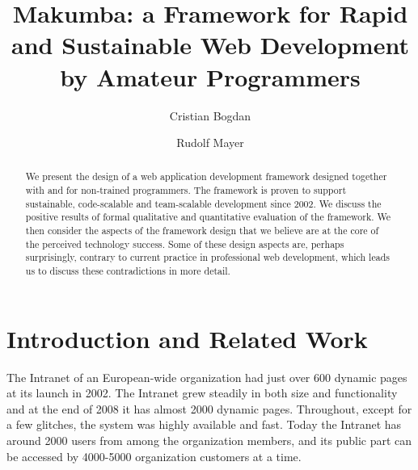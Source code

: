 \documentclass{llncs}
\begin{document}
\title{Makumba: a Framework for Rapid and Sustainable Web Development by Amateur Programmers}

\author{Cristian Bogdan  \and Rudolf Mayer}
%


\maketitle
\begin{abstract}
We present the design of a web application development framework designed together with and for non-trained programmers. The framework is proven to support sustainable, code-scalable and team-scalable development since 2002. We discuss the positive results of formal qualitative and quantitative evaluation of the framework. We then consider the aspects of the framework design that we believe are at the core of the perceived technology success. Some of these design aspects are, perhaps surprisingly, contrary to current practice in professional web development, which leads us to discuss these contradictions in more detail.
\end{abstract}

\section{Introduction and Related Work}\label{sec:introduction}
The Intranet of an European-wide organization had just over 600 dynamic pages at its launch in 2002. The Intranet grew steadily in both size and functionality and at the end of 2008 it has almost 2000 dynamic pages. Throughout, except for a few glitches, the system was highly available and fast. Today the Intranet has around 2000 users from among the organization members, and its public part can be accessed by 4000-5000 organization customers at a time.
\end{document}
